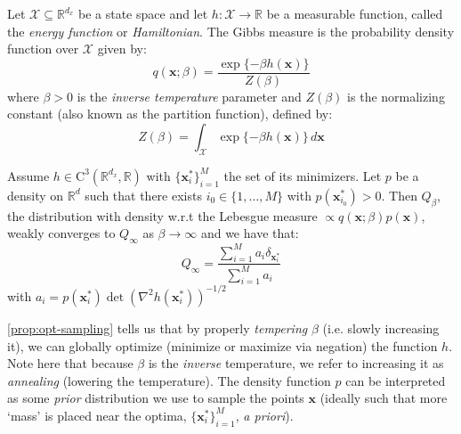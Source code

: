 \begin{definition}
    Let $\mathcal{X} \subseteq \mathbb{R}^{d_x}$ be a state space and let
    $h: \mathcal{X} \rightarrow \mathbb{R}$ be a measurable function, called the
    \emph{energy function} or \emph{Hamiltonian}. The Gibbs measure is the probability density
    function over $\mathcal{X}$ given by:
    \begin{equation}
        q(\mathbf{x}; \beta) = \frac{\exp\{-\beta h(\mathbf{x})\}}{Z(\beta)} \label{eq:gibbs-measure}
    \end{equation}
    where $\beta > 0$ is the \emph{inverse temperature} parameter and $Z(\beta)$ is the normalizing
    constant (also known as the partition function), defined by:
    \begin{equation*}
        Z(\beta) = \int_{\mathcal{X}} \exp\{-\beta h(\mathbf{x})\} \, d\mathbf{x}
    \end{equation*}
\end{definition}

\begin{proposition} \label{prop:opt-sampling}
    Assume $h \in \mathrm{C}^3(\mathbb{R}^{d_x}, \mathbb{R})$ with $\{\mathbf{x}_i^*\}_{i=1}^M$ the
    set of its minimizers. Let $p$ be a density on $\mathbb{R}^d$ such that there exists
    $i_0 \in \{1, \dots, M\}$ with $p(\mathbf{x}_{i_0}^*) > 0$. Then $Q_\beta$, the distribution
    with density w.r.t the Lebesgue measure $\propto q(\mathbf{x}; \beta)p(\mathbf{x})$, weakly
    converges to $Q_{\infty}$ as $\beta \rightarrow \infty$ and we have that:
    \begin{equation}
        Q_\infty = \frac{\sum_{i=1}^{M}a_i\delta_{\mathbf{x}_i^*}}{\sum_{i=1}^{M}a_i} \label{eq:opt-target-inf}
    \end{equation}
    with $a_i = p(\mathbf{x}_i^*)\det(\nabla^2h(\mathbf{x}_i^*))^{-1/2}$
\end{proposition}

\begin{remark}[Annealing]
    \autoref{prop:opt-sampling} tells us that by properly \emph{tempering}
    $\beta$ (i.e. slowly increasing it), we can globally optimize (minimize or maximize via
    negation) the function $h$. Note here that because $\beta$ is the \emph{inverse} temperature,
    we refer to increasing it as \emph{annealing} (lowering the temperature). The density function
    $p$ can be interpreted as some \emph{prior} distribution we use to sample the points $\mathbf{x}$
    (ideally such that more `mass' is placed near the optima, $\{\mathbf{x}_i^*\}_{i=1}^M$,
    \emph{a priori}).
\end{remark}

